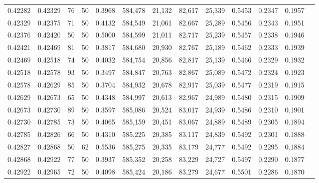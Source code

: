 \begin{tabular}{rrrrrrrrrrrrr}
0.42282 & 0.42329 &    76 &  50 &                                     0.3968 & 584,478 &  21,132 &  82,617 &  25,339 & 0.5453 & 0.2347 & 0.1957 \\
0.42329 & 0.42375 &    71 &  50 &                                     0.4132 & 584,549 &  21,061 &  82,667 &  25,289 & 0.5456 & 0.2343 & 0.1951 \\
0.42376 & 0.42420 &    50 &  50 &                                     0.5000 & 584,599 &  21,011 &  82,717 &  25,239 & 0.5457 & 0.2338 & 0.1946 \\
0.42421 & 0.42469 &    81 &  50 &                                     0.3817 & 584,680 &  20,930 &  82,767 &  25,189 & 0.5462 & 0.2333 & 0.1939 \\
0.42469 & 0.42518 &    74 &  50 &                                     0.4032 & 584,754 &  20,856 &  82,817 &  25,139 & 0.5466 & 0.2329 & 0.1932 \\
0.42518 & 0.42578 &    93 &  50 &                                     0.3497 & 584,847 &  20,763 &  82,867 &  25,089 & 0.5472 & 0.2324 & 0.1923 \\
0.42578 & 0.42629 &    85 &  50 &                                     0.3704 & 584,932 &  20,678 &  82,917 &  25,039 & 0.5477 & 0.2319 & 0.1915 \\
0.42629 & 0.42673 &    65 &  50 &                                     0.4348 & 584,997 &  20,613 &  82,967 &  24,989 & 0.5480 & 0.2315 & 0.1909 \\
0.42673 & 0.42730 &    89 &  50 &                                     0.3597 & 585,086 &  20,524 &  83,017 &  24,939 & 0.5486 & 0.2310 & 0.1901 \\
0.42730 & 0.42785 &    73 &  50 &                                     0.4065 & 585,159 &  20,451 &  83,067 &  24,889 & 0.5489 & 0.2305 & 0.1894 \\
0.42785 & 0.42826 &    66 &  50 &                                     0.4310 & 585,225 &  20,385 &  83,117 &  24,839 & 0.5492 & 0.2301 & 0.1888 \\
0.42827 & 0.42868 &    50 &  62 &                                     0.5536 & 585,275 &  20,335 &  83,179 &  24,777 & 0.5492 & 0.2295 & 0.1884 \\
0.42868 & 0.42922 &    77 &  50 &                                     0.3937 & 585,352 &  20,258 &  83,229 &  24,727 & 0.5497 & 0.2290 & 0.1877 \\
0.42922 & 0.42965 &    72 &  50 &                                     0.4098 & 585,424 &  20,186 &  83,279 &  24,677 & 0.5501 & 0.2286 & 0.1870 \\

\end{tabular}
